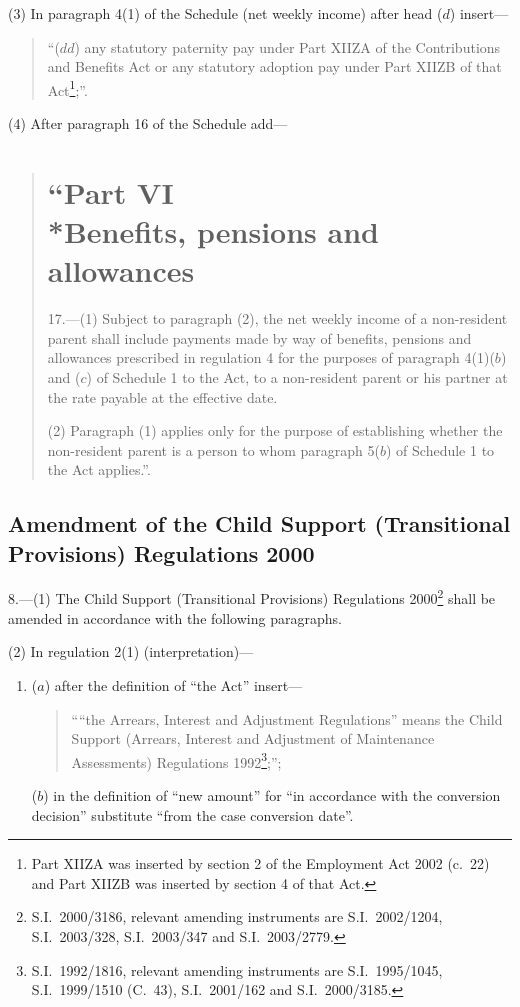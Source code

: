 \documentclass[12pt,a4paper]{article}
\begin{document}
(3) In paragraph 4(1) of the Schedule (net weekly income) after head ($d$)  insert—
\begin{quotation}
“($dd$) any statutory paternity pay under Part XIIZA of the Contributions and Benefits Act or any statutory adoption pay under Part XIIZB of that Act\footnote{Part XIIZA was inserted by section 2 of the Employment Act 2002 (c.\ 22) and Part XIIZB was inserted by section 4 of that Act.};”.
\end{quotation}

(4) After paragraph 16 of the Schedule add—
\begin{quotation}
\section*{“Part VI\\*Benefits, pensions and allowances}

17.---(1)  Subject to paragraph (2), the net weekly income of a non-resident parent shall include payments made by way of benefits, pensions and allowances prescribed in regulation 4 for the purposes of paragraph 4(1)($b$)  and ($c$)  of Schedule 1 to the Act, to a non-resident parent or his partner at the rate payable at the effective date.

(2) Paragraph (1) applies only for the purpose of establishing whether the non-resident parent is a person to whom paragraph 5($b$)  of Schedule 1 to the Act applies.”.
\end{quotation}

\subsection[8. Amendment of the Child Support (Transitional Provisions) Regulations 2000]{Amendment of the Child Support (Transitional Provisions) Regulations 2000}

8.---(1)  The Child Support (Transitional Provisions) Regulations 2000\footnote{S.I.\ 2000/3186, relevant amending instruments are S.I.\ 2002/1204, S.I.\ 2003/328, S.I.\ 2003/347 and S.I.\ 2003/2779.} shall be amended in accordance with the following paragraphs.

(2) In regulation 2(1) (interpretation)—
\begin{enumerate}\item[]
($a$) after the definition of “the Act” insert—
\begin{quotation}
““the Arrears, Interest and Adjustment Regulations” means the Child Support (Arrears, Interest and Adjustment of Maintenance Assessments) Regulations 1992\footnote{S.I.\ 1992/1816, relevant amending instruments are S.I.\ 1995/1045, S.I.\ 1999/1510 (C.\ 43), S.I.\ 2001/162 and S.I.\ 2000/3185.};”;
\end{quotation}

($b$) in the definition of “new amount” for “in accordance with the conversion decision” substitute “from the case conversion date”.
\end{enumerate}
\end{document}
